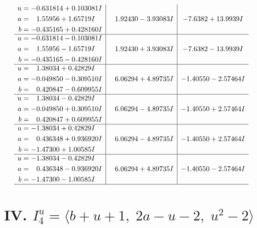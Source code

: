 \documentclass[1p]{elsarticle_modified}
\theoremstyle{definition}
\begin{document}
$$\begin{array}{c|c|c}
\begin{aligned}
u &= -0.631814 + 0.103081 I \\
a &= \phantom{-}1.55956 + 1.65719 I \\
b &= -0.435165 + 0.428160 I\end{aligned}
 & \phantom{-}1.92430 - 3.93083 I & -7.6382 + 13.9939 I \\ \hline\begin{aligned}
u &= -0.631814 - 0.103081 I \\
a &= \phantom{-}1.55956 - 1.65719 I \\
b &= -0.435165 - 0.428160 I\end{aligned}
 & \phantom{-}1.92430 + 3.93083 I & -7.6382 - 13.9939 I \\ \hline\begin{aligned}
u &= \phantom{-}1.38034 + 0.42829 I \\
a &= -0.049850 - 0.309510 I \\
b &= \phantom{-}0.420847 - 0.609955 I\end{aligned}
 & \phantom{-}6.06294 + 4.89735 I & -1.40550 - 2.57464 I \\ \hline\begin{aligned}
u &= \phantom{-}1.38034 - 0.42829 I \\
a &= -0.049850 + 0.309510 I \\
b &= \phantom{-}0.420847 + 0.609955 I\end{aligned}
 & \phantom{-}6.06294 - 4.89735 I & -1.40550 + 2.57464 I \\ \hline\begin{aligned}
u &= -1.38034 + 0.42829 I \\
a &= \phantom{-}0.436348 + 0.936920 I \\
b &= -1.47300 + 1.00585 I\end{aligned}
 & \phantom{-}6.06294 - 4.89735 I & -1.40550 + 2.57464 I \\ \hline\begin{aligned}
u &= -1.38034 - 0.42829 I \\
a &= \phantom{-}0.436348 - 0.936920 I \\
b &= -1.47300 - 1.00585 I\end{aligned}
 & \phantom{-}6.06294 + 4.89735 I & -1.40550 - 2.57464 I\\
 \hline 
 \end{array}$$\newpage\newpage\renewcommand{\arraystretch}{1}
\centering \section*{IV. $I^u_{4}= \langle b+u+1,\;2 a- u-2,\;u^2-2 \rangle$}
\end{document}

